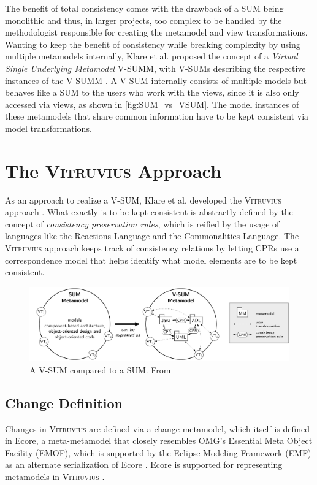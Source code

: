 The benefit of total consistency comes with the drawback of a SUM being monolithic and thus, in larger projects, too complex to be handled by the methodologist responsible for creating the metamodel and view transformations.
Wanting to keep the benefit of consistency while breaking complexity by using multiple metamodels internally, Klare et al. proposed the concept of a \emph{Virtual Single Underlying Metamodel} V-SUMM, with V-SUMs describing the respective instances of the V-SUMM \cite{VitruviusKlare2021}.
A V-SUM internally consists of multiple models but behaves like a SUM to the users who work with the views, since it is also only accessed via views, as shown in \autoref{fig:SUM_vs_VSUM}.
The model instances of these metamodels that share common information have to be kept consistent via model transformations. 

\section{The \textsc{Vitruvius} Approach}
\label{sec:Foundations:Vitruvius}
As an approach to realize a V-SUM, Klare et al. developed the \textsc{Vitruvius} approach \cite{VitruviusKlare2021}.
What exactly is to be kept consistent is abstractly defined by the concept of \emph{consistency preservation rules}, which is reified by the usage of languages like  the Reactions Language and the Commonalities Language.
The \textsc{Vitruvius} approach keeps track of consistency relations by letting CPRs use a correspondence model that helps identify what model elements are to be kept consistent.

\begin{figure}
\centering
\includegraphics[width=15cm]{figures/SUM_vs_VSUM.png}
\caption{A V-SUM compared to a SUM. From \cite{VitruviusKlare2021}}
\label{fig:SUM_vs_VSUM}
\end{figure}

\subsection{Change Definition}
Changes in \textsc{Vitruvius} are defined via a change metamodel, which itself is defined in Ecore, a meta-metamodel that closely resembles OMG's Essential Meta Object Facility (EMOF), which is supported by the Eclipse Modeling Framework (EMF) as an alternate serialization of Ecore \cite[p. 39]{steinberg_emf_2008}.
Ecore is supported for representing metamodels in \textsc{Vitruvius} \cite{kramer_specification_2017}.


